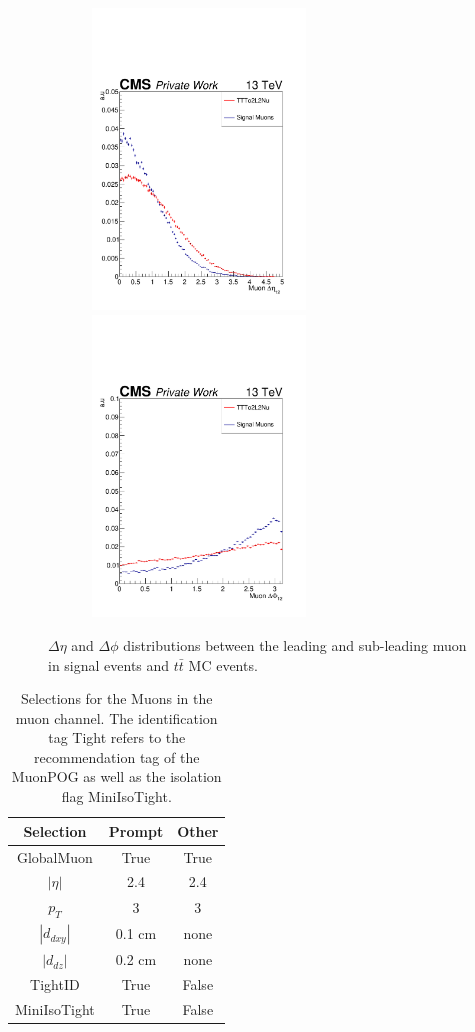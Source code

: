 \documentclass{cernatlasnote}
\begin{document}
        \begin{figure}[ht]
\centering
\includegraphics[height=8cm, width=8cm, trim= 0cm 0cm 0cm 0.cm,clip]{images/Muon/MuonMuondEta.pdf}\includegraphics[height=8cm, width=8cm, trim= 0cm 0cm 0cm 0.cm,clip]{images/Muon/MuonMuondPhi.pdf}
\caption{\label{fig:MuondR} $\Delta\eta$ and $\Delta\phi$ distributions between the leading and sub-leading muon in signal events and $t\bar{t}$ MC events.}
\end{figure}
\FloatBarrier

\begin{table}[h]
\centering
\begin{tabular}{|c|c|c|}
  \hline
  \rowcolor{lightgray} 
  Selection & Prompt & Other \\
  \hline
  GlobalMuon & True & True\\
  $|\eta|$ & 2.4 & 2.4\\
  $p_T$ & 3 & 3\\
  $|d_{dxy}|$ & 0.1 cm & none\\
  $|d_{dz}|$ & 0.2 cm & none\\
  TightID & True & False\\
  MiniIsoTight & True & False\\
  \hline
\end{tabular}
    \caption{Selections for the Muons in the muon channel. The identification tag Tight refers to the recommendation tag of the MuonPOG \cite{MuonIDRun2} as well as the isolation flag MiniIsoTight. 
    \label{tab:MUONSEL}}
\end{table}
\end{document}
